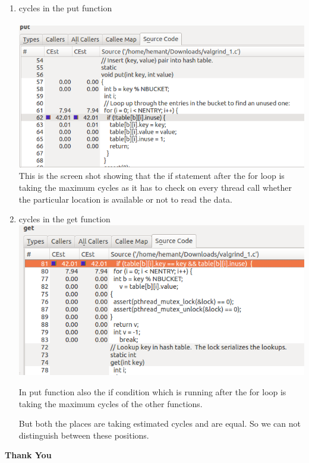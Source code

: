 \documentclass{sem5}
\begin{document}
\begin{itemize}
\begin{enumerate}
\item cycles in the put function\\\\
\includegraphics[scale=0.6]{cycles_in_put.png}\\
This is the screen shot showing that the if statement after the for loop is taking the maximum cycles as it has to check on every thread call whether the particular location is available or not to read the data.
\item cycles in the get function\\
\includegraphics[scale=0.6]{cycles_in_get.png}

In put function also the if condition which is running after the for loop is taking the maximum cycles of the other functions.

But both the places are taking estimated cycles and are equal. So we can not distinguish between these positions. 

\end{enumerate}



\end{itemize}
\vspace{4cm}

\begin{center}
\textbf{Thank You}
\end{center}
\end{document}
